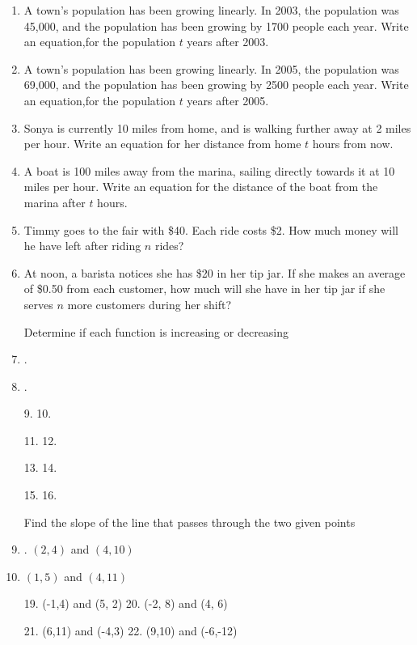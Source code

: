 \begin{enumerate}

\item   A town's population has been growing linearly. In 2003, the population was 45,000, and the population has been growing by 1700 people each year. Write an equation,for the population $t$ years after 2003.

\item A town's population has been growing linearly. In 2005, the population
  was 69,000, and the population has been growing by 2500 people each
  year. Write an equation,for the population $t$ years after 2005.

\item
  Sonya is currently 10 miles from home, and is walking further away at
  2 miles per hour. Write an equation for her distance from home
  $t$ hours from now.

\item
  A boat is 100 miles away from the marina, sailing directly towards it
  at 10 miles per hour. Write an equation for the distance of the boat
  from the marina after $t$ hours.

\item
  Timmy goes to the fair with \$40. Each ride costs \$2. How much money
  will he have left after riding $n$ rides?

\item
  At noon, a barista notices she has \$20 in her tip jar. If she makes
  an average of \$0.50 from each customer, how much will she have in her
  tip jar if she serves $n$ more customers during her shift?

Determine if each function is increasing or decreasing

\item. \item.

9. 10.

11. 12.

13. 14.

15. 16.

Find the slope of the line that passes through the two given points

\item. $(2, 4)$ and $(4, 10)$

\item $(1, 5)$ and $(4, 11)$

19. (-1,4) and (5, 2) 20. (-2, 8) and (4, 6)

21. (6,11) and (-4,3) 22. (9,10) and (-6,-12)


\end{enumerate}
